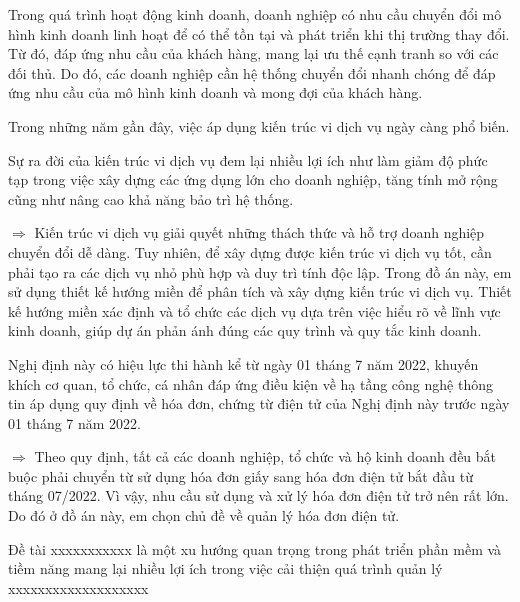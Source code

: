 Trong quá trình hoạt động kinh doanh,   doanh nghiệp  có nhu cầu chuyển đổi  mô hình kinh doanh   linh hoạt  để có thể tồn tại và phát triển khi thị trường thay đổi.  Từ đó, đáp ứng nhu cầu của khách hàng, mang lại ưu thế cạnh tranh so với các đối thủ. Do đó, các doanh nghiệp cần hệ thống chuyển đổi nhanh chóng để đáp ứng nhu cầu của mô hình kinh doanh và mong đợi của khách hàng.






Trong những năm gần đây, việc áp dụng kiến trúc vi dịch vụ  ngày càng phổ biến.

Sự ra đời của kiến trúc vi dịch vụ đem lại nhiều lợi ích như làm giảm độ phức tạp trong việc xây dựng các ứng dụng lớn cho doanh nghiệp, tăng tính mở rộng cũng như nâng cao khả năng bảo trì hệ thống.





$\Rightarrow$ Kiến trúc vi dịch vụ giải quyết những thách thức và hỗ trợ doanh nghiệp chuyển đổi dễ dàng. Tuy nhiên, để xây dựng được kiến trúc vi dịch vụ tốt, cần phải tạo ra các dịch vụ nhỏ phù hợp và duy trì tính độc lập. Trong đồ án này, em sử dụng thiết kế hướng miền để phân tích và xây dựng kiến trúc vi dịch vụ. Thiết kế hướng miền xác định và tổ chức các dịch vụ dựa trên việc hiểu rõ về lĩnh vực kinh doanh, giúp dự án phản ánh đúng các quy trình và quy tắc kinh doanh.




Nghị định này có hiệu lực thi hành kể từ ngày 01 tháng 7 năm 2022, khuyến khích cơ quan, tổ chức, cá nhân đáp ứng điều kiện về hạ tầng công nghệ thông tin áp dụng quy định về hóa đơn, chứng từ điện tử của Nghị định này trước ngày 01 tháng 7 năm 2022.



$\Rightarrow$ Theo quy định, tất cả các doanh nghiệp, tổ chức và hộ kinh doanh đều bắt buộc phải chuyển từ sử dụng hóa đơn giấy sang hóa đơn điện tử bắt đầu từ tháng 07/2022. Vì vậy, nhu cầu sử dụng và xử lý hóa đơn điện tử trở nên rất lớn. Do đó ở đồ án này, em chọn chủ đề về quản lý hóa đơn điện tử.

Đề tài xxxxxxxxxxx là một xu hướng quan trọng trong phát triển phần mềm và tiềm năng mang lại nhiều lợi ích trong việc cải thiện quá trình quản lý xxxxxxxxxxxxxxxxxxx
